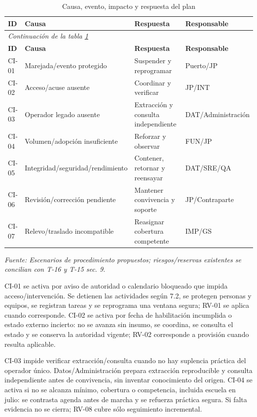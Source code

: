 \begingroup\small\setlength{\tabcolsep}{3pt}
\begin{longtable}{p{}p{}p{}p{}}
\caption{Causa, evento, impacto y respuesta del plan}\label{tab:t18-contingencias}\\\hline
\textbf{ID} & \textbf{Causa} & \textbf{Respuesta} & \textbf{Responsable}\\\hline\endfirsthead
\multicolumn{4}{l}{\textit{Continuación de la tabla \ref{tab:t18-contingencias}}}\\\hline
\textbf{ID} & \textbf{Causa} & \textbf{Respuesta} & \textbf{Responsable}\\\hline\endhead
\hline\endfoot\hline\endlastfoot
CI-01 & Marejada/evento protegido & Suspender y reprogramar & Puerto/JP\\\hline
CI-02 & Acceso/acuse ausente & Coordinar y verificar & JP/INT\\\hline
CI-03 & Operador legado ausente & Extracción y consulta independiente & DAT/Administración\\\hline
CI-04 & Volumen/adopción insuficiente & Reforzar y observar & FUN/JP\\\hline
CI-05 & Integridad/seguridad/rendimiento & Contener, retornar y reensayar & DAT/SRE/QA\\\hline
CI-06 & Revisión/corrección pendiente & Mantener convivencia y soporte & JP/Contraparte\\\hline
CI-07 & Relevo/traslado incompatible & Reasignar cobertura competente & IMP/GS\\\hline
\end{longtable}\endgroup
\noindent\textit{Fuente: Escenarios de procedimiento propuestos; riesgos/reservas existentes se concilian con T-16 y T-15 sec. 9.}

CI-01 se activa por aviso de autoridad o calendario bloqueado que impida acceso/intervención. Se detienen las actividades según 7.2, se protegen personas y equipos, se registran tareas y se reprograma una ventana segura; RV-01 se aplica cuando corresponde. CI-02 se activa por fecha de habilitación incumplida o estado externo incierto: no se avanza sin insumo, se coordina, se consulta el estado y se conserva la autoridad vigente; RV-02 corresponde a provisión cuando resulta aplicable.

CI-03 impide verificar extracción/consulta cuando no hay suplencia práctica del operador único. Datos/Administración prepara extracción reproducible y consulta independiente antes de convivencia, sin inventar conocimiento del origen. CI-04 se activa si no se alcanza mínimo, cobertura o competencia, incluida escuela en julio: se contrasta agenda antes de marcha y se refuerza práctica segura. Si falta evidencia no se cierra; RV-08 cubre sólo seguimiento incremental.

